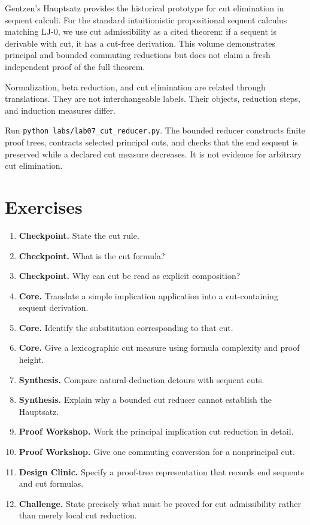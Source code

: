 

\begin{formal}[title={Imported theorem: cut admissibility}]
Gentzen's Hauptsatz provides the historical prototype for cut elimination in sequent calculi. For the standard intuitionistic propositional sequent calculus matching $\mathrm{LJ}\text{-}0$, we use cut admissibility as a cited theorem: if a sequent is derivable with cut, it has a cut-free derivation. This volume demonstrates principal and bounded commuting reductions but does not claim a fresh independent proof of the full theorem.
\end{formal}



\begin{warningbox}
Normalization, beta reduction, and cut elimination are related through translations. They are not interchangeable labels. Their objects, reduction steps, and induction measures differ.
\end{warningbox}

\begin{labbox}
Run \texttt{python labs/lab07_cut_reducer.py}. The bounded reducer constructs finite proof trees, contracts selected principal cuts, and checks that the end sequent is preserved while a declared cut measure decreases. It is not evidence for arbitrary cut elimination.
\end{labbox}

\section*{Exercises}
\begin{enumerate}[label=\textbf{7.\arabic*.}]
\item \textbf{Checkpoint.} State the cut rule.
\item \textbf{Checkpoint.} What is the cut formula?
\item \textbf{Checkpoint.} Why can cut be read as explicit composition?
\item \textbf{Core.} Translate a simple implication application into a cut-containing sequent derivation.
\item \textbf{Core.} Identify the substitution corresponding to that cut.
\item \textbf{Core.} Give a lexicographic cut measure using formula complexity and proof height.
\item \textbf{Synthesis.} Compare natural-deduction detours with sequent cuts.
\item \textbf{Synthesis.} Explain why a bounded cut reducer cannot establish the Hauptsatz.
\item \textbf{Proof Workshop.} Work the principal implication cut reduction in detail.
\item \textbf{Proof Workshop.} Give one commuting conversion for a nonprincipal cut.
\item \textbf{Design Clinic.} Specify a proof-tree representation that records end sequents and cut formulas.
\item \textbf{Challenge.} State precisely what must be proved for cut admissibility rather than merely local cut reduction.
\end{enumerate}
